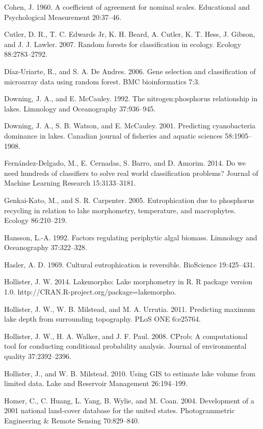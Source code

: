 \documentclass[12pt,]{article}
\begin{document}
Cohen, J. 1960. A coefficient of agreement for nominal scales.
Educational and Psychological Measurement 20:37--46.

Cutler, D. R., T. C. Edwards Jr, K. H. Beard, A. Cutler, K. T. Hess, J.
Gibson, and J. J. Lawler. 2007. Random forests for classification in
ecology. Ecology 88:2783--2792.

D{í}az-Uriarte, R., and S. A. De Andres. 2006. Gene selection and
classification of microarray data using random forest. BMC
bioinformatics 7:3.

Downing, J. A., and E. McCauley. 1992. The nitrogen:phosphorus
relationship in lakes. Limnology and Oceanography 37:936--945.

Downing, J. A., S. B. Watson, and E. McCauley. 2001. Predicting
cyanobacteria dominance in lakes. Canadian journal of fisheries and
aquatic sciences 58:1905--1908.

Fernández-Delgado, M., E. Cernadas, S. Barro, and D. Amorim. 2014. Do we
need hundreds of classifiers to solve real world classification
problems? Journal of Machine Learning Research 15:3133--3181.

Genkai-Kato, M., and S. R. Carpenter. 2005. Eutrophication due to
phosphorus recycling in relation to lake morphometry, temperature, and
macrophytes. Ecology 86:210--219.

Hansson, L.-A. 1992. Factors regulating periphytic algal biomass.
Limnology and Oceanography 37:322--328.

Hasler, A. D. 1969. Cultural eutrophication is reversible. BioScience
19:425--431.

Hollister, J. W. 2014. Lakemorpho: Lake morphometry in R. R package
version 1.0. http://CRAN.R-project.org/package=lakemorpho.

Hollister, J. W., W. B. Milstead, and M. A. Urrutia. 2011. Predicting
maximum lake depth from surrounding topography. PLoS ONE 6:e25764.

Hollister, J. W., H. A. Walker, and J. F. Paul. 2008. CProb: A
computational tool for conducting conditional probability analysis.
Journal of environmental quality 37:2392--2396.

Hollister, J., and W. B. Milstead. 2010. Using GIS to estimate lake
volume from limited data. Lake and Reservoir Management 26:194--199.

Homer, C., C. Huang, L. Yang, B. Wylie, and M. Coan. 2004. Development
of a 2001 national land-cover database for the united states.
Photogrammetric Engineering \& Remote Sensing 70:829--840.
\end{document}

